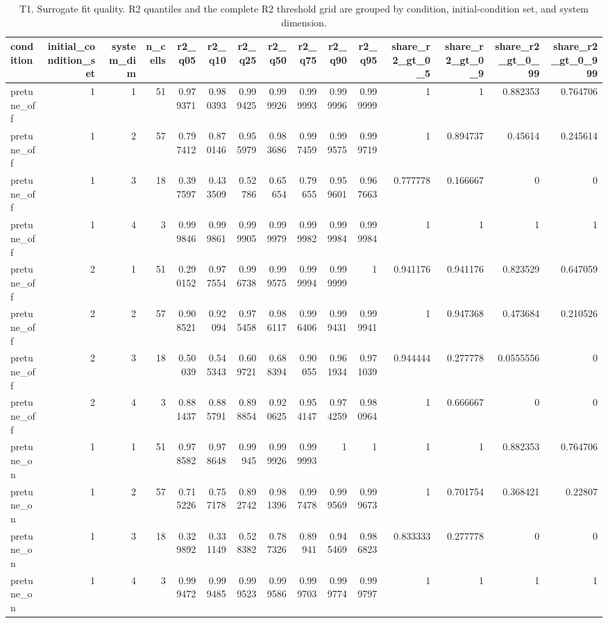\begin{table}[htbp]
\centering
\caption{T1. Surrogate fit quality. R2 quantiles and the complete R2 threshold grid are grouped by condition, initial-condition set, and system dimension.}
\begin{tabular}{lrrrrrrrrrrrrrr}
\toprule
condition & initial\_condition\_set & system\_dim & n\_cells & r2\_q05 & r2\_q10 & r2\_q25 & r2\_q50 & r2\_q75 & r2\_q90 & r2\_q95 & share\_r2\_gt\_0\_5 & share\_r2\_gt\_0\_9 & share\_r2\_gt\_0\_99 & share\_r2\_gt\_0\_999 \\
\midrule
pretune\_off & 1 & 1 & 51 & 0.979371 & 0.980393 & 0.999425 & 0.999926 & 0.999993 & 0.999996 & 0.999999 & 1 & 1 & 0.882353 & 0.764706 \\
pretune\_off & 1 & 2 & 57 & 0.797412 & 0.870146 & 0.955979 & 0.983686 & 0.997459 & 0.999575 & 0.999719 & 1 & 0.894737 & 0.45614 & 0.245614 \\
pretune\_off & 1 & 3 & 18 & 0.397597 & 0.433509 & 0.52786 & 0.65654 & 0.79655 & 0.959601 & 0.967663 & 0.777778 & 0.166667 & 0 & 0 \\
pretune\_off & 1 & 4 & 3 & 0.999846 & 0.999861 & 0.999905 & 0.999979 & 0.999982 & 0.999984 & 0.999984 & 1 & 1 & 1 & 1 \\
pretune\_off & 2 & 1 & 51 & 0.290152 & 0.977554 & 0.996738 & 0.999575 & 0.999994 & 0.999999 & 1 & 0.941176 & 0.941176 & 0.823529 & 0.647059 \\
pretune\_off & 2 & 2 & 57 & 0.908521 & 0.92094 & 0.975458 & 0.986117 & 0.996406 & 0.999431 & 0.999941 & 1 & 0.947368 & 0.473684 & 0.210526 \\
pretune\_off & 2 & 3 & 18 & 0.50039 & 0.545343 & 0.609721 & 0.688394 & 0.90055 & 0.961934 & 0.971039 & 0.944444 & 0.277778 & 0.0555556 & 0 \\
pretune\_off & 2 & 4 & 3 & 0.881437 & 0.885791 & 0.898854 & 0.920625 & 0.954147 & 0.974259 & 0.980964 & 1 & 0.666667 & 0 & 0 \\
pretune\_on & 1 & 1 & 51 & 0.978582 & 0.978648 & 0.99945 & 0.999926 & 0.999993 & 1 & 1 & 1 & 1 & 0.882353 & 0.764706 \\
pretune\_on & 1 & 2 & 57 & 0.715226 & 0.757178 & 0.892742 & 0.981396 & 0.997478 & 0.999569 & 0.999673 & 1 & 0.701754 & 0.368421 & 0.22807 \\
pretune\_on & 1 & 3 & 18 & 0.329892 & 0.331149 & 0.528382 & 0.787326 & 0.89941 & 0.945469 & 0.986823 & 0.833333 & 0.277778 & 0 & 0 \\
pretune\_on & 1 & 4 & 3 & 0.999472 & 0.999485 & 0.999523 & 0.999586 & 0.999703 & 0.999774 & 0.999797 & 1 & 1 & 1 & 1 \\

\end{tabular}
\end{table}
